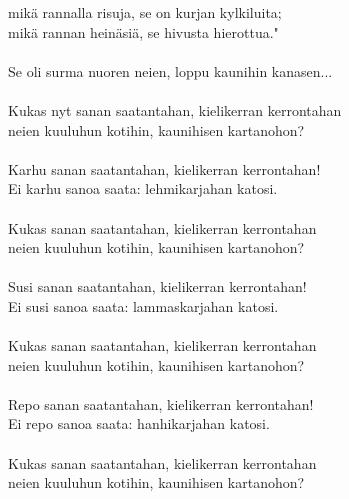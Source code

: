 mikä rannalla risuja, se on kurjan kylkiluita;                 \\
mikä rannan heinäsiä, se hivusta hierottua."                   \\
                                                               \\
Se oli surma nuoren neien, loppu kaunihin kanasen...           \\
                                                               \\
Kukas nyt sanan saatantahan, kielikerran kerrontahan           \\
neien kuuluhun kotihin, kaunihisen kartanohon?                 \\
                                                               \\
Karhu sanan saatantahan, kielikerran kerrontahan!              \\
Ei karhu sanoa saata: lehmikarjahan katosi.                    \\
                                                               \\
Kukas sanan saatantahan, kielikerran kerrontahan               \\
neien kuuluhun kotihin, kaunihisen kartanohon?                 \\
                                                               \\
Susi sanan saatantahan, kielikerran kerrontahan!               \\
Ei susi sanoa saata: lammaskarjahan katosi.                    \\
                                                               \\
Kukas sanan saatantahan, kielikerran kerrontahan               \\
neien kuuluhun kotihin, kaunihisen kartanohon?                 \\
                                                               \\
Repo sanan saatantahan, kielikerran kerrontahan!               \\
Ei repo sanoa saata: hanhikarjahan katosi.                     \\
                                                               \\
Kukas sanan saatantahan, kielikerran kerrontahan               \\
neien kuuluhun kotihin, kaunihisen kartanohon?                 \\
